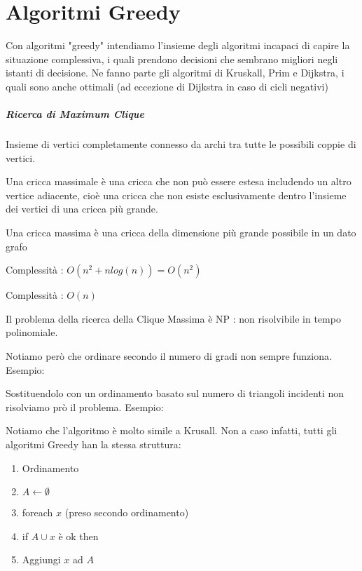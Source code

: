 \chapter{Algoritmi Greedy}
Con algoritmi "greedy" intendiamo l'insieme degli algoritmi incapaci di capire la situazione complessiva, i quali prendono decisioni che sembrano migliori negli istanti di decisione. Ne fanno parte gli algoritmi di Kruskall, Prim e Dijkstra, i quali sono anche ottimali (ad eccezione di Dijkstra in caso di cicli negativi)

\paragraph{Ricerca di Maximum Clique}

Insieme di vertici completamente connesso da archi tra tutte le possibili coppie di vertici.

Una cricca massimale è una cricca che non può essere estesa includendo un altro vertice adiacente, cioè una cricca che non esiste esclusivamente dentro l'insieme dei vertici di una cricca più grande.

Una cricca massima è una cricca della dimensione più grande possibile in un dato grafo




Complessità : $O(n^2 + nlog(n)) = O(n^2)$



Complessità : $O(n)$

Il problema della ricerca della Clique Massima è NP : non risolvibile in tempo polinomiale.

Notiamo però che ordinare secondo il numero di gradi non sempre funziona. Esempio:



Sostituendolo con un ordinamento basato sul numero di triangoli incidenti non risolviamo prò il problema. Esempio:



Notiamo che l'algoritmo è molto simile a Krusall. Non a caso infatti, tutti gli algoritmi Greedy han la stessa struttura:

\begin{enumerate}
\item Ordinamento
\item $ A \leftarrow \emptyset$
\item foreach $x$ (preso secondo ordinamento)
\item \hspace{\parindent} if $A \cup x$ è ok then
\item \hspace{\parindent} \hspace{\parindent} Aggiungi $x$ ad $A$
\end{enumerate}

